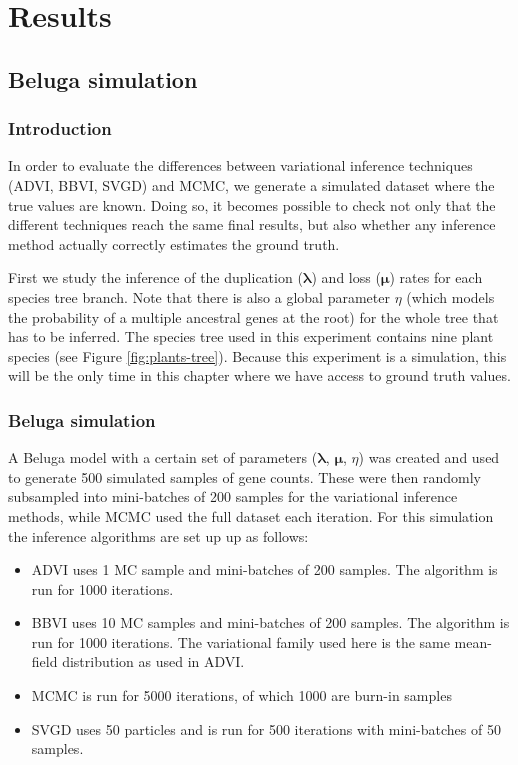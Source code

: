 \chapter{Results} \label{sec:results}

\section{Beluga simulation}

\subsection{Introduction}
\par In order to evaluate the differences between variational inference techniques (ADVI, BBVI, SVGD) and MCMC, we generate a simulated dataset where the true values are known. Doing so, it becomes possible to check not only that the different techniques reach the same final results, but also whether any inference method actually correctly estimates the ground truth.
\medskip
\par First we study the inference of the duplication ($\bm\lambda$) and loss ($\bm\mu$) rates for each species tree branch. Note that there is also a global parameter $\eta$ (which models the probability of a multiple ancestral genes at the root) for the whole tree that has to be inferred. The species tree used in this experiment contains nine plant species (see Figure \ref{fig:plants-tree}). Because this experiment is a simulation, this will be the only time in this chapter where we have access to ground truth values.

\subsection{Beluga simulation}

A Beluga model with a certain set of parameters ($\bm\lambda$, $\bm\mu$, $\eta$) was created and used to generate 500 simulated samples of gene counts. These were then randomly subsampled into mini-batches of 200 samples for the variational inference methods, while MCMC used the full dataset each iteration.
\medskip
For this simulation the inference algorithms are set up up as follows:
\begin{itemize}
    \item ADVI uses 1 MC sample and mini-batches of 200 samples. The algorithm is run for 1000 iterations.
    \item BBVI uses 10 MC samples and mini-batches of 200 samples. The algorithm is run for 1000 iterations. The variational family used here is the same mean-field distribution as used in ADVI.
    \item MCMC is run for 5000 iterations, of which 1000 are burn-in samples
    \item SVGD uses 50 particles and is run for 500 iterations with mini-batches of 50 samples.
\end{itemize}

